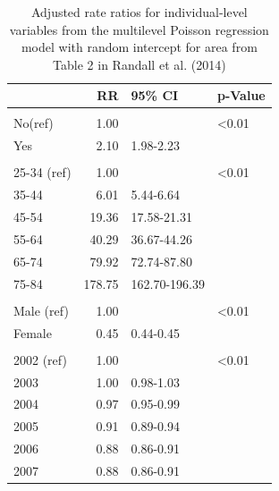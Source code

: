 \documentclass[
]{krantz}
\begin{document}
\begin{table}

\caption{\label{tab:table4chp11}Adjusted rate ratios for individual-level variables from the multilevel Poisson regression model with random intercept for area from Table 2 in Randall et al. (2014)}
\centering
\begin{tabular}[t]{lrll}
\toprule
  & RR & 95\% CI & p-Value\\
\midrule
\addlinespace[0.3em]
\multicolumn{4}{l}{\textbf{Aboriginal}}\\
\hspace{1em}No(ref) & 1.00 &  & <0.01\\
\hspace{1em}Yes & 2.10 & 1.98-2.23 & \\
\addlinespace[0.3em]
\multicolumn{4}{l}{\textbf{Age Group}}\\
\hspace{1em}25-34 (ref) & 1.00 &  & <0.01\\
\hspace{1em}35-44 & 6.01 & 5.44-6.64 & \\
\hspace{1em}45-54 & 19.36 & 17.58-21.31 & \\
\hspace{1em}55-64 & 40.29 & 36.67-44.26 & \\
\hspace{1em}65-74 & 79.92 & 72.74-87.80 & \\
\hspace{1em}75-84 & 178.75 & 162.70-196.39 & \\
\addlinespace[0.3em]
\multicolumn{4}{l}{\textbf{Sex}}\\
\hspace{1em}Male (ref) & 1.00 &  & <0.01\\
\hspace{1em}Female & 0.45 & 0.44-0.45 & \\
\addlinespace[0.3em]
\multicolumn{4}{l}{\textbf{Year}}\\
\hspace{1em}2002 (ref) & 1.00 &  & <0.01\\
\hspace{1em}2003 & 1.00 & 0.98-1.03 & \\
\hspace{1em}2004 & 0.97 & 0.95-0.99 & \\
\hspace{1em}2005 & 0.91 & 0.89-0.94 & \\
\hspace{1em}2006 & 0.88 & 0.86-0.91 & \\
\hspace{1em}2007 & 0.88 & 0.86-0.91 & \\
\bottomrule
\end{tabular}
\end{table}
\end{document}
